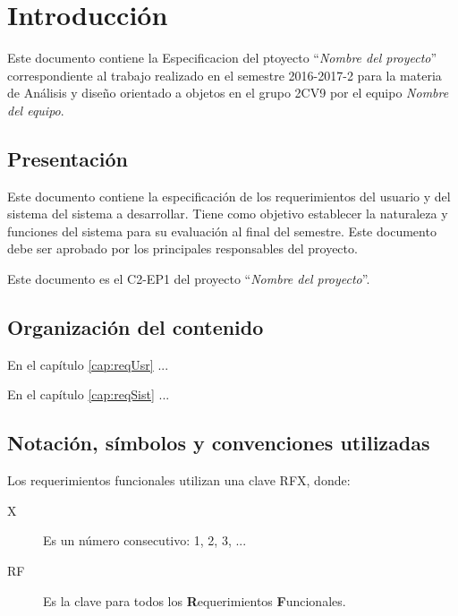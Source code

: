 \chapter{Introducción}


	Este documento contiene la Especificacion del ptoyecto ``{\em Nombre del proyecto}'' correspondiente al trabajo realizado en el semestre 2016-2017-2 para la materia de Análisis y diseño orientado a objetos en el grupo 2CV9 por el equipo {\em Nombre del equipo}.

\section{Presentación}


	Este documento contiene la especificación de los requerimientos del usuario y del sistema del sistema a desarrollar. Tiene como objetivo establecer la naturaleza y funciones del sistema para su evaluación al final del semestre. Este documento debe ser aprobado por los principales responsables del proyecto.
	
	Este documento es el C2-EP1 del proyecto ``{\em Nombre del proyecto}''.
	
\section{Organización del contenido}

	En el capítulo \ref{cap:reqUsr} ...
	
	En el capítulo \ref{cap:reqSist} ...

\section{Notación, símbolos y convenciones utilizadas}

	Los requerimientos funcionales utilizan una clave RFX, donde:
	
\begin{description}
	\item[X] Es un número consecutivo: 1, 2, 3, ...
	\item[RF] Es la clave para todos los {\bf R}equerimientos {\bf F}uncionales.
\end{description}

